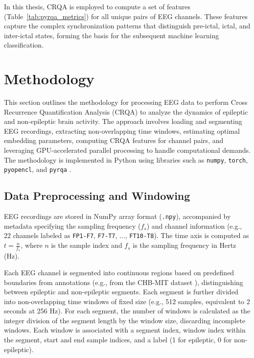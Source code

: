 \documentclass{article}
\begin{document}
					In this thesis, CRQA is employed to compute a set of features (Table~\ref{tab:pyrqa_metrics}) for all unique pairs of EEG channels. These features capture the complex synchronization patterns that distinguish pre-ictal, ictal, and inter-ictal states, forming the basis for the subsequent machine learning classification.







	\newpage
				

					
				\section{Methodology}
				\label{sec:methodology}

				This section outlines the methodology for processing EEG data to perform Cross Recurrence Quantification Analysis (CRQA) to analyze the dynamics of epileptic and non-epileptic brain activity. The approach involves loading and segmenting EEG recordings, extracting non-overlapping time windows, estimating optimal embedding parameters, computing CRQA features for channel pairs, and leveraging GPU-accelerated parallel processing to handle computational demands. The methodology is implemented in Python using libraries such as \texttt{numpy}, \texttt{torch}, \texttt{pyopencl}, and \texttt{pyrqa} \cite{pyrqacitation}.

				\subsection{Data Preprocessing and Windowing}
				\label{subsec:data_preprocessing}

				EEG recordings are stored in NumPy array format (\texttt{.npy}), accompanied by metadata specifying the sampling frequency (\(f_s\)) and channel information (e.g., 22 channels labeled as \texttt{FP1-F7}, \texttt{F7-T7}, ..., \texttt{FT10-T8}). The time axis is computed as \(t = \frac{n}{f_s}\), where \(n\) is the sample index and \(f_s\) is the sampling frequency in Hertz (Hz).

				Each EEG channel is segmented into continuous regions based on predefined boundaries from annotations (e.g., from the CHB-MIT dataset \cite{shoeb2010application}), distinguishing between epileptic and non-epileptic segments. Each segment is further divided into non-overlapping time windows of fixed size (e.g., 512 samples, equivalent to 2 seconds at 256 Hz). For each segment, the number of windows is calculated as the integer division of the segment length by the window size, discarding incomplete windows. Each window is associated with a segment index, window index within the segment, start and end sample indices, and a label (1 for epileptic, 0 for non-epileptic).
\end{document}
